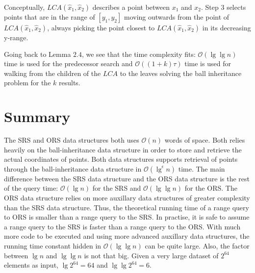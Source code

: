 Conceptually, $LCA(\hat{x}_1, \hat{x}_2)$ describes a point between $x_1$ and $x_2$. Step $3$ selects points that are in the range of $[y_1, y_2]$ moving outwards from the point of $LCA(\hat{x}_1, \hat{x}_2)$, always picking the point closest to $LCA(\hat{x}_1, \hat{x}_2)$ in its decreasing y-range. 

Going back to Lemma $2.4$, we see that the time complexity fits: $\mathcal{O}(\lg \lg n)$ time is used for the predecessor search and $\mathcal{O}((1+k)\tau)$ time is used for walking from the children of the $LCA$ to the leaves solving the ball inheritance problem for the $k$ results.

\section{Summary}
\label{sect:summaryprim}

The SRS and ORS data structures both uses $\mathcal{O}(n)$ words of space. Both relies heavily on the ball-inheritance data structure in order to store and retrieve the actual coordinates of points. Both data structures supports retrieval of points through the ball-inheritance data structure in $\mathcal{O}(\lg^\epsilon n)$ time. The main difference between the SRS data structure and the ORS data structure is the rest of the query time: $\mathcal{O}(\lg n)$ for the SRS and $\mathcal{O}(\lg \lg n)$ for the ORS. The ORS data structure relies on more auxillary data structures of greater complexity than the SRS data structure. Thus, the theoretical running time of a range query to ORS is smaller than a range query to the SRS. In practise, it is safe to assume a range query to the SRS is faster than a range query to the ORS. With much more code to be executed and using more advanced auxillary data structures, the running time constant hidden in $\mathcal{O}(\lg \lg n)$ can be quite large. Also,  the factor between $\lg n$ and $\lg \lg n$ is not that big. Given a very large dataset of $2^64$ elements as input, $\lg 2^64 = 64$ and $\lg \lg 2^64 = 6$. \\


